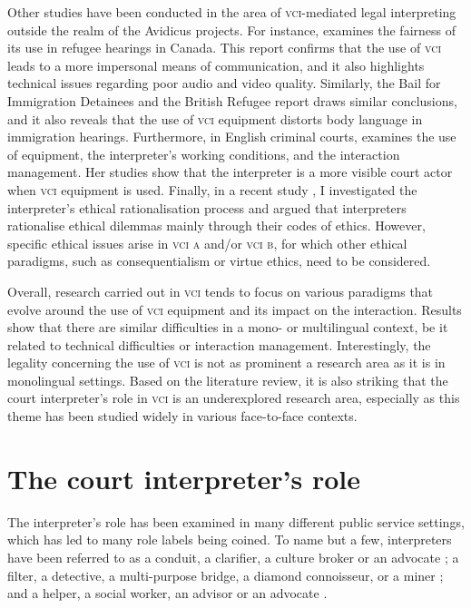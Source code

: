 \documentclass[output=paper]{langsci/langscibook}
\begin{document}
Other studies have been conducted in the area of \textsc{vci}-mediated legal interpreting outside the realm of the Avidicus projects. For instance, \citet{Ellis2004} examines the fairness of its use in refugee hearings in Canada. This report confirms that the use of \textsc{vci} leads to a more impersonal means of communication, and it also highlights technical issues regarding poor audio and video quality. Similarly, the Bail for Immigration Detainees and the British Refugee  report draws similar conclusions, and it also reveals that the use of \textsc{vci} equipment distorts body language in immigration hearings. Furthermore, in English criminal courts, \citet{Fowler2012} examines the use of equipment, the interpreter’s working conditions, and the interaction management. Her studies show that the interpreter is a more visible court actor when \textsc{vci} equipment is used. Finally, in a recent study \citet{Devaux2017a}, I investigated the interpreter’s ethical rationalisation process and argued that interpreters rationalise ethical dilemmas mainly through their codes of ethics. However, specific ethical issues arise in \textsc{vci a} and/or \textsc{vci b}, for which other ethical paradigms, such as consequentialism or virtue ethics, need to be considered. 

Overall, research carried out in \textsc{vci} tends to focus on various paradigms that evolve around the use of \textsc{vci} equipment and its impact on the interaction. Results show that there are similar difficulties in a mono- or multilingual context, be it related to technical difficulties or interaction management. Interestingly, the legality concerning the use of \textsc{vci} is not as prominent a research area as it is in monolingual settings. Based on the literature review, it is also striking that the court interpreter’s role in \textsc{vci} is an underexplored research area, especially as this theme has been studied widely in various face-to-face contexts. 

\section{The court interpreter’s role}
\label{sec:devaux:3}
The interpreter’s role has been examined in many different public service settings, which has led to many role labels being coined. To name but a few, interpreters have been referred to as a conduit, a clarifier, a culture broker or an advocate \citep{Niska2002}; a filter, a detective, a multi-purpose bridge, a diamond connoisseur, or a miner \citep{Angelelli2004}; and a helper, a social worker, an advisor or an advocate \citep{Grbic2011}.
\end{document}
